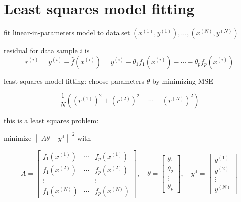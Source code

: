 \section{Least squares model fitting}

\begin{problem}
    fit linear-in-parameters model to data set $ \left(x^{(1)}, y^{(1)}\right), \ldots,\left(x^{(N)}, y^{(N)}\right) $
\end{problem}

\begin{theorem}
    residual for data sample $ i $ is
$$
r^{(i)}=y^{(i)}-\hat{f}\left(x^{(i)}\right)=y^{(i)}-\theta_{1} f_{1}\left(x^{(i)}\right)-\cdots-\theta_{p} f_{p}\left(x^{(i)}\right)
$$
\end{theorem}

\begin{problem}
    least squares model fitting: choose parameters $ \theta $ by minimizing MSE

    $$
    \frac{1}{N}\left(\left(r^{(1)}\right)^{2}+\left(r^{(2)}\right)^{2}+\cdots+\left(r^{(N)}\right)^{2}\right)
    $$
\end{problem}

this is a least squares problem: 

\begin{problem}
    minimize $ \left\|A \theta-y^{\mathrm{d}}\right\|^{2} $ with

$$
A=\left[\begin{array}{ccc}
f_{1}\left(x^{(1)}\right) & \cdots & f_{p}\left(x^{(1)}\right) \\
f_{1}\left(x^{(2)}\right) & \cdots & f_{p}\left(x^{(2)}\right) \\
\vdots & & \vdots \\
f_{1}\left(x^{(N)}\right) & \cdots & f_{p}\left(x^{(N)}\right)
\end{array}\right], \quad \theta=\left[\begin{array}{c}
\theta_{1} \\
\theta_{2} \\
\vdots \\
\theta_{p}
\end{array}\right], \quad y^{\mathrm{d}}=\left[\begin{array}{c}
y^{(1)} \\
y^{(2)} \\
\vdots \\
y^{(N)}
\end{array}\right]
$$
\end{problem}



